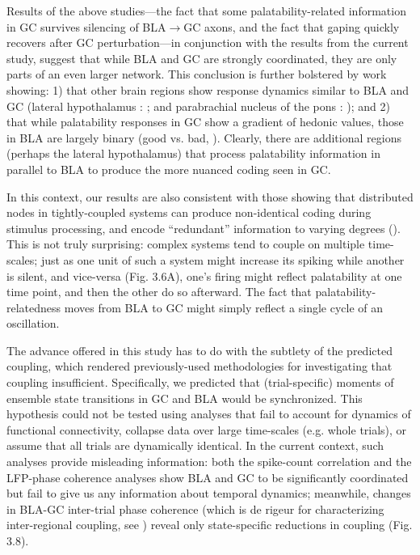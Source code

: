 \begin{refsection}
Results of the above studies—the fact that some palatability-related information in GC survives silencing of BLA$\rightarrow$GC axons, and the fact that gaping quickly recovers after GC perturbation—in conjunction with the results from the current study, suggest that while BLA and GC are strongly coordinated, they are only parts of an even larger network. This conclusion is further bolstered by work showing: 1) that other brain regions show response dynamics similar to BLA and GC (lateral hypothalamus : \cite{li2013a}; and parabrachial nucleus of the pons : \cite{baez-santiago2016a}); and 2) that while palatability responses in GC show a gradient of hedonic values, those in BLA are largely binary (good vs. bad, \cite{fontanini2009a,sadacca2012a}). Clearly, there are additional regions (perhaps the lateral hypothalamus) that process palatability information in parallel to BLA to produce the more nuanced coding seen in GC. 

In this context, our results are also consistent with those showing that distributed nodes in tightly-coupled systems can produce non-identical coding during stimulus processing, and encode “redundant” information to varying degrees (\cite{siegel2015a,brincat2018a,lara2018a,saravani2019a}). This is not truly surprising: complex systems tend to couple on multiple time-scales; just as one unit of such a system might increase its spiking while another is silent, and vice-versa (Fig. 3.6A), one’s firing might reflect palatability at one time point, and then the other do so afterward. The fact that palatability-relatedness moves from BLA to GC might simply reflect a single cycle of an oscillation.

The advance offered in this study has to do with the subtlety of the predicted coupling, which rendered previously-used methodologies for investigating that coupling insufficient. Specifically, we predicted that (trial-specific) moments of ensemble state transitions in GC and BLA would be synchronized. This hypothesis could not be tested using analyses that fail to account for dynamics of functional connectivity, collapse data over large time-scales (e.g. whole trials), or assume that all trials are dynamically identical. In the current context, such analyses provide misleading information: both the spike-count correlation and the LFP-phase coherence analyses show BLA and GC to be significantly coordinated but fail to give us any information about temporal dynamics; meanwhile, changes in BLA-GC inter-trial phase coherence (which is de rigeur for characterizing inter-regional coupling, see \cite{engel2020a,kramer2020a,zareian2020a,zielinski2019a}) reveal only state-specific reductions in coupling (Fig. 3.8).


\end{refsection}
